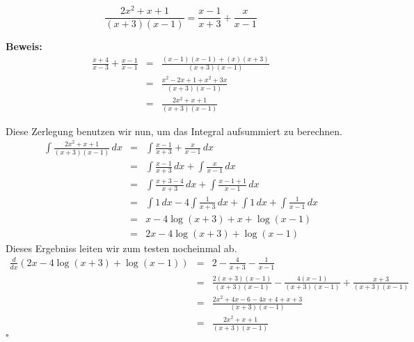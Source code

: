 \documentclass[11pt,a4paper,ngerman]{article}
\begin{document}
\begin{enumerate}[a.]
\begin{description}
                $$
                    \frac{2x^2 + x + 1}{(x+3)(x-1)} = \frac{x-1}{x+3} + \frac{x}{x-1}
                $$
            \item{\bfseries\rmfamily Beweis:}
                $$\begin{array}{rcl}
                    \frac{x+4}{x-3} + \frac{x-1}{x-1}
                        &=& \frac{(x-1)(x-1) + (x)(x+3)}{(x+3)(x-1)}\\
                        &=& \frac{x^2 - 2x + 1 + x^2 + 3x}{(x+3)(x-1)}\\
                        &=& \frac{2x^2  + x + 1}{(x+3)(x-1)}
                \end{array}$$
        \end{description}
        Diese Zerlegung benutzen wir nun, um das Integral aufsummiert zu berechnen.\\
        $$\begin{array}{rcl}
            \int \frac{2x^2 + x + 1}{(x+3)(x-1)} \, dx &=& \int \frac{x-1}{x+3} + \frac{x}{x-1} \, dx\\
                &=& \int \frac{x-1}{x+3} \, dx + \int \frac{x}{x-1} \, dx \\
                &=& \int \frac{x+3-4}{x+3} \, dx + \int \frac{x-1+1}{x-1} \, dx\\
                &=& \int 1 \, dx - 4\int \frac{1}{x+3} \, dx + \int 1 \, dx + \int \frac{1}{x-1} \, dx\\
                &=& x - 4 \log (x+3) + x + \log(x-1)\\
                &=& 2x - 4\log(x+3) + \log(x-1)
        \end{array}$$
        Dieses Ergebniss leiten wir zum testen nocheinmal ab.\\
        $$\begin{array}{rcl}
            \frac{d}{dx} \left( 2x - 4\log(x+3) + \log(x-1) \right)
                &=& 2 - \frac{4}{x+3} - \frac{1}{x-1}\\
                &=& \frac{2(x+3)(x-1)}{(x+3)(x-1)} - \frac{4(x-1)}{(x+3)(x-1)} + \frac{x+3}{(x+3)(x-1)}\\
                &=& \frac{2x^2 + 4 x - 6 - 4x + 4 + x  + 3}{(x+3)(x-1)}\\
                &=& \frac{2x^2 + x + 1}{(x+3)(x-1)}
        \end{array}$$
        \mbox{}\hfill $\square$

\end{enumerate}

\end{document}
